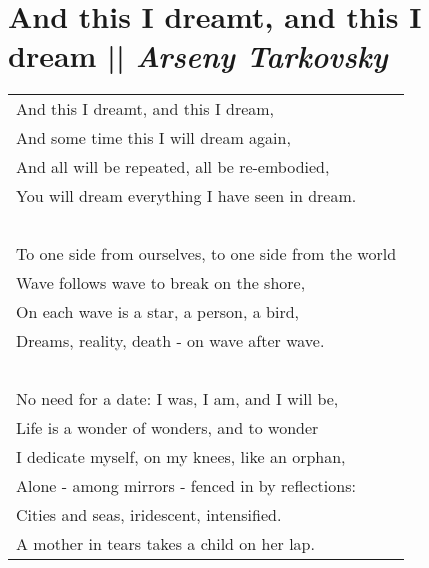 
\section[And this I dreamt, and this I dream]{And this I dreamt, and this I dream || \emph{Arseny Tarkovsky} \hspace*{\fill}  \thepage}
\label{sec:And_this_I_dreamt,_and_this_I_dream.tex}
\vspace*{2cm}
\begin{center}
\begin{tabular}{l}
And this I dreamt, and this I dream,\\
And some time this I will dream again,\\
And all will be repeated, all be re-embodied,\\
You will dream everything I have seen in dream.\\
\-\ \\
To one side from ourselves, to one side from the world\\
Wave follows wave to break on the shore,\\
On each wave is a star, a person, a bird,\\
Dreams, reality, death - on wave after wave.\\
\-\ \\
No need for a date: I was, I am, and I will be,\\
Life is a wonder of wonders, and to wonder\\
I dedicate myself, on my knees, like an orphan,\\
Alone - among mirrors - fenced in by reflections:\\
Cities and seas, iridescent, intensified.\\
A mother in tears takes a child on her lap.\\
\end{tabular}
\end{center}